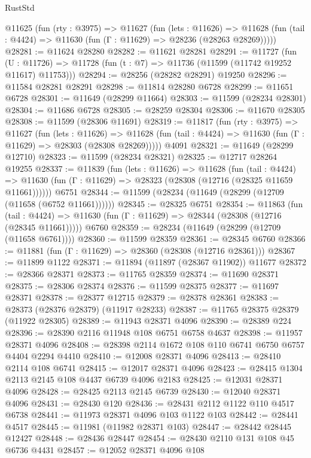 \begin{lexlean}{RustStd}
\begin{coremodule}
  @11625
    (fun (rty : @3975) =>
    @11627
      (fun (lets : @11626) =>
      @11628 (fun (tail : @4424) => @11630 (fun (Γ : @11629) => @28236 (@28263 @28269)))))
@28281 := @11624 @28280
@28282 := @11621 @28281
@28291 := @11727
    (fun (U : @11726) => @11728 (fun (t : @7) => @11736 (@11599 (@11742 @19252 @11617) @11753)))
@28294 := @28256 (@28282 @28291) @19250
@28296 := @11584 @28281 @28291
@28298 := @11814 @28280 @6728
@28299 := @11651 @6728
@28301 := @11649 (@28299 @11664)
@28303 := @11599 (@28234 @28301)
@28304 := @11686 @6728
@28305 := @28259 @28304
@28306 := @11670 @28305
@28308 := @11599 (@28306 @11691)
@28319 := @11817
    (fun (rty : @3975) =>
    @11627
      (fun (lets : @11626) =>
      @11628 (fun (tail : @4424) => @11630 (fun (Γ : @11629) => @28303 (@28308 @28269)))))
    @4091
@28321 := @11649 (@28299 @12710)
@28323 := @11599 (@28234 @28321)
@28325 := @12717 @28264 @19255
@28337 := @11839
    (fun (lets : @11626) =>
    @11628
      (fun (tail : @4424) =>
      @11630 (fun (Γ : @11629) => @28323 (@28308 (@12716 (@28325 @11659 @11661))))))
    @6751
@28344 := @11599 (@28234 (@11649 (@28299 (@12709 (@11658 (@6752 @11661))))))
@28345 := @28325 @6751
@28354 := @11863
    (fun (tail : @4424) => @11630 (fun (Γ : @11629) => @28344 (@28308 (@12716 (@28345 @11661)))))
    @6760
@28359 := @28234 (@11649 (@28299 (@12709 (@11658 @6761))))
@28360 := @11599 @28359
@28361 := @28345 @6760
@28366 := @11881 (fun (Γ : @11629) => @28360 (@28308 (@12716 @28361)))
@28367 := @11899 @1122
@28371 := @11894 (@11897 (@28367 @11902)) @11677
@28372 := @28366 @28371
@28373 := @11765 @28359
@28374 := @11690 @28371
@28375 := @28306 @28374
@28376 := @11599 @28375
@28377 := @11697 @28371
@28378 := @28377 @12715
@28379 := @28378 @28361
@28383 := @28373 (@28376 @28379) (@11917 @28233)
@28387 := @11765 @28375 @28379 (@11922 @28305)
@28389 := @11943 @28371 @4096
@28390 := @28389 @224
@28396 := @28390 @2116 @11948 @108 @6751 @6758 @4637
@28398 := @11957 @28371 @4096
@28408 := @28398 @2114 @1672 @108 @110 @6741 @6750 @6757 @4404 @2294 @4410
@28410 := @12008 @28371 @4096
@28413 := @28410 @2114 @108 @6741
@28415 := @12017 @28371 @4096
@28423 := @28415 @1304 @2113 @2145 @108 @4437 @6739 @4096 @2183
@28425 := @12031 @28371 @4096
@28428 := @28425 @2113 @2145 @6739
@28430 := @12040 @28371 @4096
@28431 := @28430 @120
@28436 := @28431 @2112 @1122 @110 @4517 @6738
@28441 := @11973 @28371 @4096 @103 @1122 @103
@28442 := @28441 @4517
@28445 := @11981 (@11982 @28371 @103)
@28447 := @28442 @28445 @12427
@28448 := @28436 @28447
@28454 := @28430 @2110 @131 @108 @45 @6736 @4431
@28457 := @12052 @28371 @4096 @108

\end{coremodule}
\end{lexlean}
